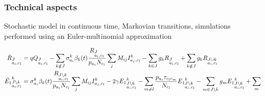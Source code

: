 \documentclass{beamer}
\begin{document}
\begin{frame}
  \frametitle{Technical aspects}
  \alert{Stochastic} model in continuous time, Markovian
  transitions, simulations performed using an Euler-multinomial approximation

\begin{tiny}
\begin{align}
\dot{R}_{\begin{subarray}{l}J\\ a_i, c_l \end{subarray}} &=  q Q_{\begin{subarray}{l}J  \\ a_i,
    c_l \end{subarray}} - \sum_{k \notin J} \sigma_{a_i}^k \beta_k(t)
\frac{R_{\begin{subarray}{l}J\\ a_i, c_l \end{subarray}}}{p_{a_i} N_{c_l}} \sum_j M_{ij}
I^k_{a_j,c_l} -\sum_{k
  \in J} g_k R_{\begin{subarray}{l}J\\ a_i, c_l \end{subarray}} + \sum_{k
  \notin J} g_k R_{\begin{subarray}{l}J \cup k \\ a_i, c_l \end{subarray}} \notag \\
\dot{E_1}^k_{\begin{subarray}{l}J \setminus k\\ a_i,
    c_l \end{subarray}} &=\sigma_{a_i}^k \beta_k(t)
\frac{R_{\begin{subarray}{l}J \setminus k\\ a_i, c_l \end{subarray}}}{p_{a_i} N_{c_l}} \sum_j M_{ij}
I^k_{a_j,c_l} -2 \gamma {E_1}^k_{\begin{subarray}{l}J
    \setminus k\\ a_i, c_l \end{subarray}} -\sum_{m\neq l}
\frac{p_{a_i} \tau_{c_lc_m}}{N_{c_l}} {E_1}^k_{\begin{subarray}{l}J \setminus k\\ a_i,
    c_l \end{subarray}} -\sum_{m
  \in J \setminus k} g_m {E_1}^k_{\begin{subarray}{l}J \setminus k\\ a_i, c_l \end{subarray}} + \sum_{m
}
\end{align}
\end{tiny}
\end{frame}
\end{document}
